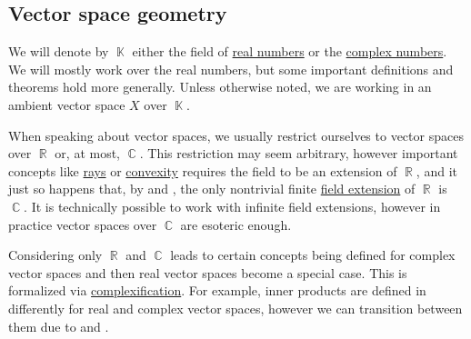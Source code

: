 \subsection{Vector space geometry}\label{subsec:vector_space_geometry}

We will denote by \( \BbbK \) either the field of \hyperref[def:real_numbers]{real numbers} or the \hyperref[def:real_numbers]{complex numbers}. We will mostly work over the real numbers, but some important definitions and theorems hold more generally. Unless otherwise noted, we are working in an ambient vector space \( X \) over \( \BbbK \).

\begin{remark}\label{rem:real_field_extensions}
  When speaking about vector spaces, we usually restrict ourselves to vector spaces over \( \BbbR \) or, at most, \( \BbbC \). This restriction may seem arbitrary, however important concepts like \hyperref[def:geometric_ray]{rays} or \hyperref[def:convex_hull]{convexity} requires the field to be an extension of \( \BbbR \), and it just so happens that, by  and , the only nontrivial finite \hyperref[def:field/submodel]{field extension} of \( \BbbR \) is \( \BbbC \). It is technically possible to work with infinite field extensions, however in practice vector spaces over \( \BbbC \) are esoteric enough.

  Considering only \( \BbbR \) and \( \BbbC \) leads to certain concepts being defined for complex vector spaces and then real vector spaces become a special case. This is formalized via \hyperref[def:complexification]{complexification}. For example, inner products are defined in  differently for real and complex vector spaces, however we can transition between them due to  and .
\end{remark}

